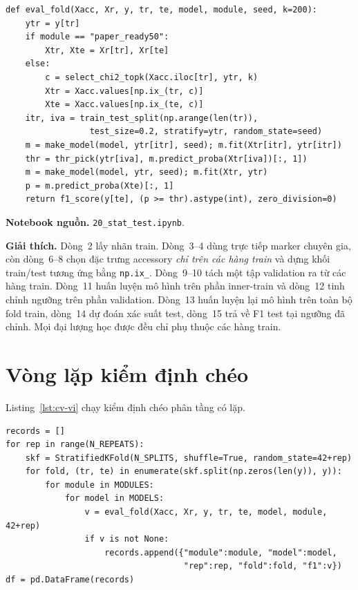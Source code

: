 \documentclass[../main.tex]{subfiles}
\begin{document}
\begin{lstlisting}[caption={Đánh giá một fold không rò rỉ.},label=lst:fold-vi]
def eval_fold(Xacc, Xr, y, tr, te, model, module, seed, k=200):
    ytr = y[tr]
    if module == "paper_ready50":
        Xtr, Xte = Xr[tr], Xr[te]
    else:
        c = select_chi2_topk(Xacc.iloc[tr], ytr, k)
        Xtr = Xacc.values[np.ix_(tr, c)]
        Xte = Xacc.values[np.ix_(te, c)]
    itr, iva = train_test_split(np.arange(len(tr)),
                 test_size=0.2, stratify=ytr, random_state=seed)
    m = make_model(model, ytr[itr], seed); m.fit(Xtr[itr], ytr[itr])
    thr = thr_pick(ytr[iva], m.predict_proba(Xtr[iva])[:, 1])
    m = make_model(model, ytr, seed); m.fit(Xtr, ytr)
    p = m.predict_proba(Xte)[:, 1]
    return f1_score(y[te], (p >= thr).astype(int), zero_division=0)
\end{lstlisting}

\noindent\textbf{Notebook nguồn.} \texttt{20\_stat\_test.ipynb}.

\noindent\textbf{Giải thích.} Dòng~2 lấy nhãn train. Dòng~3--4 dùng trực tiếp marker chuyên gia, còn dòng~6--8 chọn đặc trưng accessory \emph{chỉ trên các hàng train} và dựng khối train/test tương ứng bằng \texttt{np.ix\_}. Dòng~9--10 tách một tập validation ra từ các hàng train. Dòng~11 huấn luyện mô hình trên phần inner-train và dòng~12 tinh chỉnh ngưỡng trên phần validation. Dòng~13 huấn luyện lại mô hình trên toàn bộ fold train, dòng~14 dự đoán xác suất test, dòng~15 trả về F1 test tại ngưỡng đã chỉnh. Mọi đại lượng học được đều chỉ phụ thuộc các hàng train.

\section{Vòng lặp kiểm định chéo}

Listing~\ref{lst:cv-vi} chạy kiểm định chéo phân tầng có lặp.

\begin{lstlisting}[caption={Kiểm định chéo phân tầng có lặp.},label=lst:cv-vi]
records = []
for rep in range(N_REPEATS):
    skf = StratifiedKFold(N_SPLITS, shuffle=True, random_state=42+rep)
    for fold, (tr, te) in enumerate(skf.split(np.zeros(len(y)), y)):
        for module in MODULES:
            for model in MODELS:
                v = eval_fold(Xacc, Xr, y, tr, te, model, module, 42+rep)
                if v is not None:
                    records.append({"module":module, "model":model,
                                    "rep":rep, "fold":fold, "f1":v})
df = pd.DataFrame(records)
\end{lstlisting}
\end{document}
